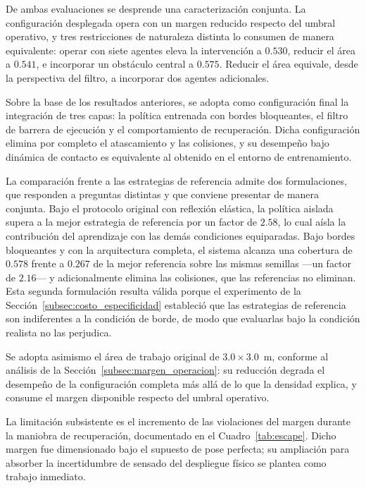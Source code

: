 De ambas evaluaciones se desprende una caracterización conjunta. La
configuración desplegada opera con un margen reducido respecto del umbral
operativo, y tres restricciones de naturaleza distinta lo consumen de manera
equivalente: operar con siete agentes eleva la intervención a $0{.}530$,
reducir el área a $0{.}541$, e incorporar un obstáculo central a $0{.}575$.
Reducir el área equivale, desde la perspectiva del filtro, a incorporar dos
agentes adicionales.



Sobre la base de los resultados anteriores, se adopta como configuración final
la integración de tres capas: la política entrenada con bordes bloqueantes, el
filtro de barrera de ejecución y el comportamiento de recuperación. Dicha
configuración elimina por completo el atascamiento y las colisiones, y su
desempeño bajo dinámica de contacto es equivalente al obtenido en el entorno de
entrenamiento.

La comparación frente a las estrategias de referencia admite dos formulaciones,
que responden a preguntas distintas y que conviene presentar de manera
conjunta. Bajo el protocolo original con reflexión elástica, la política
aislada supera a la mejor estrategia de referencia por un factor de $2{.}58$,
lo cual aísla la contribución del aprendizaje con las demás condiciones
equiparadas. Bajo bordes bloqueantes y con la arquitectura completa, el sistema
alcanza una cobertura de $0{.}578$ frente a $0{.}267$ de la mejor referencia
sobre las mismas semillas —un factor de $2{.}16$— y adicionalmente elimina las
colisiones, que las referencias no eliminan. Esta segunda formulación resulta
válida porque el experimento de la Sección~\ref{subsec:costo_especificidad}
estableció que las estrategias de referencia son indiferentes a la condición de
borde, de modo que evaluarlas bajo la condición realista no las perjudica.

Se adopta asimismo el área de trabajo original de $3{.}0 \times 3{.}0$~m,
conforme al análisis de la Sección~\ref{subsec:margen_operacion}: su reducción
degrada el desempeño de la configuración completa más allá de lo que la
densidad explica, y consume el margen disponible respecto del umbral operativo.

La limitación subsistente es el incremento de las violaciones del margen
durante la maniobra de recuperación, documentado en el
Cuadro~\ref{tab:escape}. Dicho margen fue dimensionado bajo el supuesto de
pose perfecta; su ampliación para absorber la incertidumbre de sensado del
despliegue físico se plantea como trabajo inmediato.

